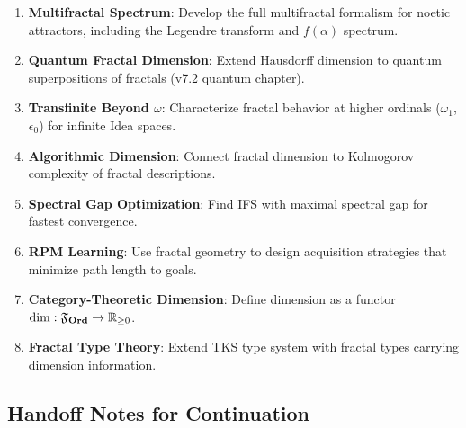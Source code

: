 \begin{enumerate}
  \item \textbf{Multifractal Spectrum}: Develop the full multifractal formalism for noetic attractors, including the Legendre transform and $f(\alpha)$ spectrum.

  \item \textbf{Quantum Fractal Dimension}: Extend Hausdorff dimension to quantum superpositions of fractals (v7.2 quantum chapter).

  \item \textbf{Transfinite Beyond $\omega$}: Characterize fractal behavior at higher ordinals ($\omega_1$, $\epsilon_0$) for infinite Idea spaces.

  \item \textbf{Algorithmic Dimension}: Connect fractal dimension to Kolmogorov complexity of fractal descriptions.

  \item \textbf{Spectral Gap Optimization}: Find IFS with maximal spectral gap for fastest convergence.

  \item \textbf{RPM Learning}: Use fractal geometry to design acquisition strategies that minimize path length to goals.

  \item \textbf{Category-Theoretic Dimension}: Define dimension as a functor $\dim : \mathfrak{F}_{\mathbf{Ord}} \to \mathbb{R}_{\geq 0}$.

  \item \textbf{Fractal Type Theory}: Extend TKS type system with fractal types carrying dimension information.
\end{enumerate}

\subsection{Handoff Notes for Continuation}

